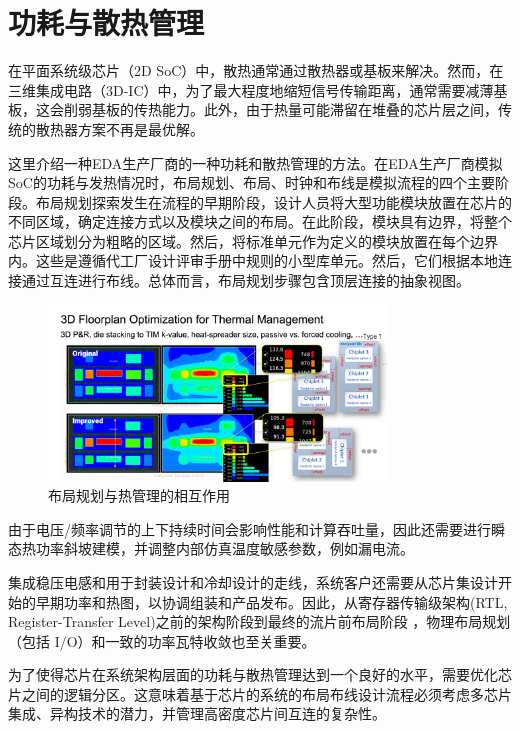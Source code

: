 \section{功耗与散热管理}

在平面系统级芯片（2D SoC）中，散热通常通过散热器或基板来解决。然而，在三维集成电路（3D-IC）中，为了最大程度地缩短信号传输距离，通常需要减薄基板，这会削弱基板的传热能力。此外，由于热量可能滞留在堆叠的芯片层之间，传统的散热器方案不再是最优解。



这里介绍一种EDA生产厂商的一种功耗和散热管理的方法。在EDA生产厂商模拟SoC的功耗与发热情况时，布局规划、布局、时钟和布线是模拟流程的四个主要阶段。布局规划探索发生在流程的早期阶段，设计人员将大型功能模块放置在芯片的不同区域，确定连接方式以及模块之间的布局。在此阶段，模块具有边界，将整个芯片区域划分为粗略的区域。然后，将标准单元作为定义的模块放置在每个边界内。这些是遵循代工厂设计评审手册中规则的小型库单元。然后，它们根据本地连接通过互连进行布线。总体而言，布局规划步骤包含顶层连接的抽象视图。

\begin{figure}[htbp]
	\centering
	\includegraphics[width=0.8\textwidth]{img/5-1.png} %
	\caption{布局规划与热管理的相互作用 \cite{Heyman2024FloorPlanning}}
	\label{fig:example}
\end{figure}

由于电压/频率调节的上下持续时间会影响性能和计算吞吐量，因此还需要进行瞬态热功率斜坡建模，并调整内部仿真温度敏感参数，例如漏电流。

集成稳压电感和用于封装设计和冷却设计的走线，系统客户还需要从芯片集设计开始的早期功率和热图，以协调组装和产品发布。因此，从寄存器传输级架构(RTL, Register-Transfer Level)之前的架构阶段到最终的流片前布局阶段 \cite{11074799}，物理布局规划（包括 I/O）和一致的功率瓦特收敛也至关重要。

为了使得芯片在系统架构层面的功耗与散热管理达到一个良好的水平，需要优化芯片之间的逻辑分区。这意味着基于芯片的系统的布局布线设计流程必须考虑多芯片集成、异构技术的潜力，并管理高密度芯片间互连的复杂性。

